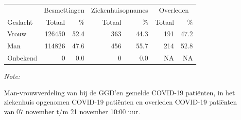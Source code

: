 \documentclass[
  english,
  man,floatsintext]{apa6}
\begin{document}
\begin{table}
\centering\begingroup\fontsize{11}{13}\selectfont

\begin{threeparttable}
\begin{tabular}{lrrrrrr}
\toprule
\multicolumn{1}{c}{ } & \multicolumn{2}{c}{Besmettingen} & \multicolumn{2}{c}{Ziekenhuisopnames} & \multicolumn{2}{c}{Overleden} \\
\cmidrule(l{3pt}r{3pt}){2-3} \cmidrule(l{3pt}r{3pt}){4-5} \cmidrule(l{3pt}r{3pt}){6-7}
Geslacht & Totaal & \% & Totaal & \% & Totaal & \%\\
\midrule
Vrouw & 126450 & 52.4 & 363 & 44.3 & 191 & 47.2\\
Man & 114826 & 47.6 & 456 & 55.7 & 214 & 52.8\\
Onbekend & 0 & 0.0 & 0 & 0.0 & NA & NA\\
\bottomrule
\end{tabular}
\begin{tablenotes}
\item \textit{Note: } 
\item Man-vrouwverdeling van bij de GGD’en gemelde COVID-19 patiënten, in het ziekenhuis opgenomen COVID-19 patiënten en overleden COVID-19 patiënten van 07 november t/m 21 november 10:00 uur.
\end{tablenotes}
\end{threeparttable}
\endgroup{}
\end{table}
\newpage
\end{document}
